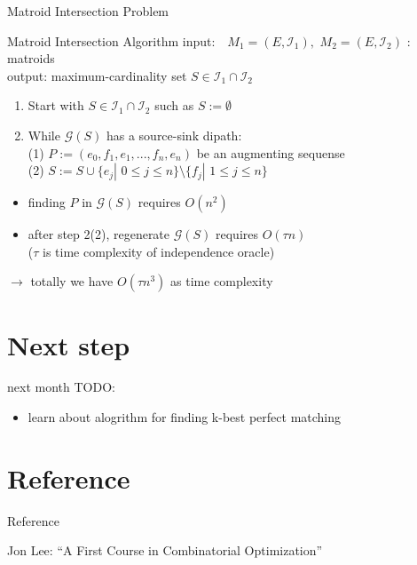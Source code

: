\documentclass[11pt,xcolor=dvipsnames,table,dvipdfmx]{beamer}
\begin{document}
\begin{frame}{Matroid Intersection Problem}
 \begin{block}{Matroid Intersection Algorithm}
  input: \,\, $M_1 = (E, \mathcal{I}_1),\,\,M_2 = (E, \mathcal{I}_2)$ : matroids\\
  output: maximum-cardinality set $S \in \mathcal{I}_1 \cap \mathcal{I}_2$
  \begin{enumerate}
   \item Start with $S \in \mathcal{I}_1 \cap \mathcal{I}_2$ such as $S := \emptyset $
   \item While $\mathcal{G}(S)$ has a source-sink dipath:\\
	 (1) $P := (e_0, f_1, e_1, ..., f_n, e_n)$ be an augmenting sequense\\
	 (2) $S := S \cup \{e_j |\,\,0 \leq j \leq n\} \setminus \{f_j |\,\,1 \leq j \leq n\}$
  \end{enumerate}
 \end{block}
 \begin{itemize}
  \item finding $P$ in $\mathcal{G}(S)$ requires $O(n^2)$\\
  \item  after step 2(2), regenerate $\mathcal{G}(S)$ requires $O(\tau n)$\\($\tau$ is time complexity of independence oracle)\\
 \end{itemize}
 $\rightarrow$ totally we have $O(\tau n^3)$ as time complexity
\end{frame}

\section{Next step}
\begin{frame}{next month}
 TODO:
 \begin{itemize}
  \item learn about alogrithm for finding k-best perfect matching
 \end{itemize}
\end{frame}

\section{Reference}
\begin{frame}{Reference}
 \begin{thebibliography}{9}
	  \small{Jon Lee: ``A First Course in Combinatorial Optimization''}
 \end{thebibliography}
\end{frame}
\end{document}

